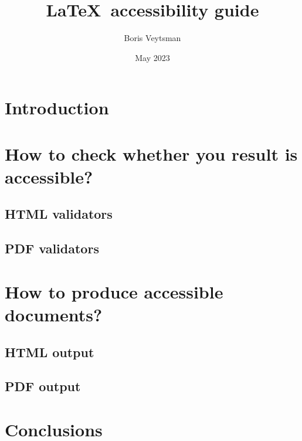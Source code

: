 \documentclass{article}
\begin{document}
\title{\LaTeX\ accessibility guide}
\author{Boris Veytsman}
\date{May 2023}
\hypersetup{
  pdftitle=LaTeX accessibility guide,
  pdfauthor=Boris Veytsman}
\maketitle

\section{Introduction}
\label{sec:intro}

\section{How to check whether you result is accessible?}
\label{sec:validators}

\subsection{HTML validators}
\label{sec:html-validators}

\subsection{PDF validators}
\label{sec:PDF-validators}

\section{How to produce accessible documents?}
\label{sec:production}

\subsection{HTML output}
\label{sec:HTML}

\subsection{PDF output}
\label{sec:PDF}

\section{Conclusions}
\label{sec:concl}
\end{document}
